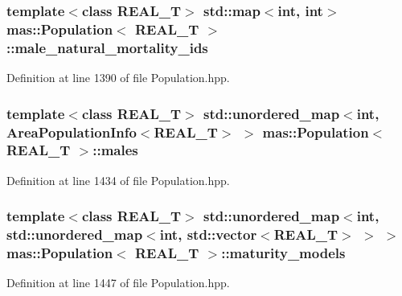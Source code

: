 \hypertarget{classmas_1_1_population_a5448f2e0761a208a5184f754b3efbbc6}{
\subsubsection[{male\-\_\-natural\-\_\-mortality\-\_\-ids}]{\setlength{\rightskip}{0pt plus 5cm}template$<$class R\-E\-A\-L\-\_\-\-T$>$ std\-::map$<$int, int$>$ {\bf mas\-::\-Population}$<$ R\-E\-A\-L\-\_\-\-T $>$\-::male\-\_\-natural\-\_\-mortality\-\_\-ids}}\label{classmas_1_1_population_a5448f2e0761a208a5184f754b3efbbc6}


Definition at line 1390 of file Population.\-hpp.

\hypertarget{classmas_1_1_population_a224336670db7b89a7d9490fddbbf88f1}{
\subsubsection[{males}]{\setlength{\rightskip}{0pt plus 5cm}template$<$class R\-E\-A\-L\-\_\-\-T$>$ std\-::unordered\-\_\-map$<$int, {\bf Area\-Population\-Info}$<$R\-E\-A\-L\-\_\-\-T$>$ $>$ {\bf mas\-::\-Population}$<$ R\-E\-A\-L\-\_\-\-T $>$\-::males}}\label{classmas_1_1_population_a224336670db7b89a7d9490fddbbf88f1}


Definition at line 1434 of file Population.\-hpp.

\hypertarget{classmas_1_1_population_a4953be176d66e895dafa26d3754339a7}{
\subsubsection[{maturity\-\_\-models}]{\setlength{\rightskip}{0pt plus 5cm}template$<$class R\-E\-A\-L\-\_\-\-T$>$ std\-::unordered\-\_\-map$<$int, std\-::unordered\-\_\-map$<$int, std\-::vector$<$R\-E\-A\-L\-\_\-\-T$>$ $>$ $>$ {\bf mas\-::\-Population}$<$ R\-E\-A\-L\-\_\-\-T $>$\-::maturity\-\_\-models}}\label{classmas_1_1_population_a4953be176d66e895dafa26d3754339a7}


Definition at line 1447 of file Population.\-hpp.

